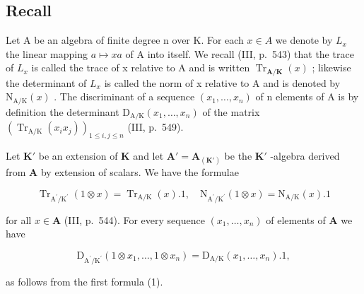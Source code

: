 \subsection{Recall}

Let A be an algebra of finite degree n over K. For each \(x \in A\) we denote by \(L_{x}\) the linear mapping \(a \mapsto xa\) of A into itself. We recall (III, p.~543) that the trace of \(L_{x}\) is called the trace of x relative to A and is written \(\operatorname{Tr}_{\mathbf{A}/\mathbf{K}}(x)\) ; likewise the determinant of \(L_{x}\) is called the norm of x relative to A and is denoted by \(\mathrm{N}_{\mathrm{A}/\mathrm{K}}(x)\) . The discriminant of a sequence \((x_{1}, \ldots, x_{n})\) of n elements of A is by definition the determinant \(\mathrm{D}_{\mathrm{A}/\mathrm{K}}(x_{1}, \ldots, x_{n})\) of the matrix \((\operatorname{Tr}_{\mathrm{A}/\mathrm{K}}(x_{i}x_{j}))_{1 \leq i,j \leq n}\) (III, p.~549).

Let \(\mathbf{K}'\) be an extension of \(\mathbf{K}\) and let \(\mathbf{A}' = \mathbf{A}_{(\mathbf{K}')}\) be the \(\mathbf{K}'\) -algebra derived from \(\mathbf{A}\) by extension of scalars. We have the formulae

\[
\operatorname{Tr} _ {\mathrm{A} ^ {\prime} / \mathrm{K} ^ {\prime}} (1 \otimes x) = \operatorname{Tr} _ {\mathrm{A} / \mathrm{K}} (x). 1, \quad \mathrm{N} _ {\mathrm{A} ^ {\prime} / \mathrm{K} ^ {\prime}} (1 \otimes x) = \mathrm{N} _ {\mathrm{A} / \mathrm{K}} (x). 1\tag{1}
\]

for all \(x \in \mathbf{A}\) (III, p.~544). For every sequence \((x_1, \ldots, x_n)\) of elements of \(\mathbf{A}\) we have

\[
\mathrm{D} _ {\mathrm{A} ^ {\prime} / \mathrm{K} ^ {\prime}} (1 \otimes x _ {1}, \dots , 1 \otimes x _ {n}) = \mathrm{D} _ {\mathrm{A} / \mathrm{K}} (x _ {1}, \dots , x _ {n}). 1,\tag{2}
\]

as follows from the first formula (1).

